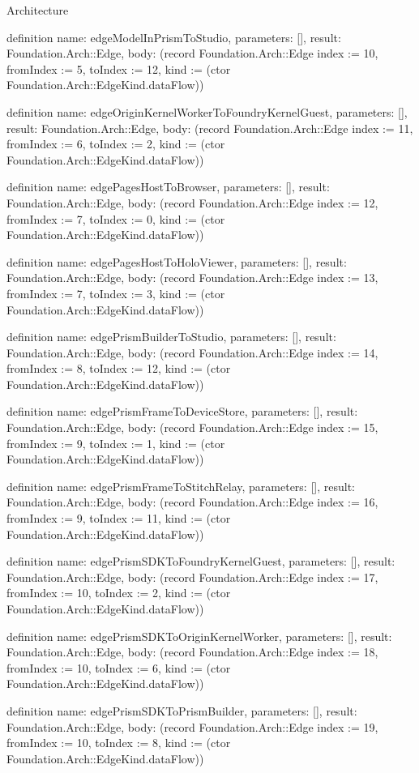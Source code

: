 \begin{lexlean}{Architecture}
\begin{semanticmodule}
definition{
  name: edgeModelInPrismToStudio,
  parameters: [],
  result: Foundation.Arch::Edge,
  body: (record Foundation.Arch::Edge {index := 10, fromIndex := 5, toIndex := 12, kind := (ctor Foundation.Arch::EdgeKind.dataFlow)})
}

definition{
  name: edgeOriginKernelWorkerToFoundryKernelGuest,
  parameters: [],
  result: Foundation.Arch::Edge,
  body: (record Foundation.Arch::Edge {index := 11, fromIndex := 6, toIndex := 2, kind := (ctor Foundation.Arch::EdgeKind.dataFlow)})
}

definition{
  name: edgePagesHostToBrowser,
  parameters: [],
  result: Foundation.Arch::Edge,
  body: (record Foundation.Arch::Edge {index := 12, fromIndex := 7, toIndex := 0, kind := (ctor Foundation.Arch::EdgeKind.dataFlow)})
}

definition{
  name: edgePagesHostToHoloViewer,
  parameters: [],
  result: Foundation.Arch::Edge,
  body: (record Foundation.Arch::Edge {index := 13, fromIndex := 7, toIndex := 3, kind := (ctor Foundation.Arch::EdgeKind.dataFlow)})
}

definition{
  name: edgePrismBuilderToStudio,
  parameters: [],
  result: Foundation.Arch::Edge,
  body: (record Foundation.Arch::Edge {index := 14, fromIndex := 8, toIndex := 12, kind := (ctor Foundation.Arch::EdgeKind.dataFlow)})
}

definition{
  name: edgePrismFrameToDeviceStore,
  parameters: [],
  result: Foundation.Arch::Edge,
  body: (record Foundation.Arch::Edge {index := 15, fromIndex := 9, toIndex := 1, kind := (ctor Foundation.Arch::EdgeKind.dataFlow)})
}

definition{
  name: edgePrismFrameToStitchRelay,
  parameters: [],
  result: Foundation.Arch::Edge,
  body: (record Foundation.Arch::Edge {index := 16, fromIndex := 9, toIndex := 11, kind := (ctor Foundation.Arch::EdgeKind.dataFlow)})
}

definition{
  name: edgePrismSDKToFoundryKernelGuest,
  parameters: [],
  result: Foundation.Arch::Edge,
  body: (record Foundation.Arch::Edge {index := 17, fromIndex := 10, toIndex := 2, kind := (ctor Foundation.Arch::EdgeKind.dataFlow)})
}

definition{
  name: edgePrismSDKToOriginKernelWorker,
  parameters: [],
  result: Foundation.Arch::Edge,
  body: (record Foundation.Arch::Edge {index := 18, fromIndex := 10, toIndex := 6, kind := (ctor Foundation.Arch::EdgeKind.dataFlow)})
}

definition{
  name: edgePrismSDKToPrismBuilder,
  parameters: [],
  result: Foundation.Arch::Edge,
  body: (record Foundation.Arch::Edge {index := 19, fromIndex := 10, toIndex := 8, kind := (ctor Foundation.Arch::EdgeKind.dataFlow)})
}


\end{semanticmodule}
\end{lexlean}
